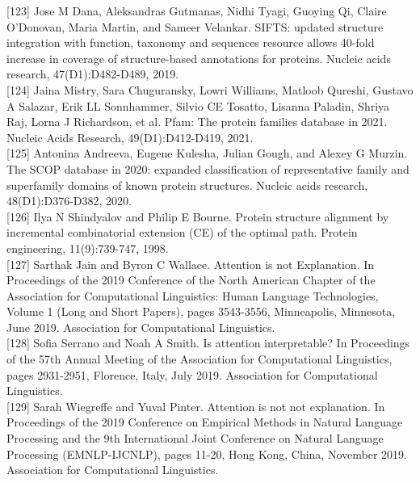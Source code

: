 \documentclass[10pt]{article}
\begin{document}
[123] Jose M Dana, Aleksandras Gutmanas, Nidhi Tyagi, Guoying Qi, Claire O'Donovan, Maria Martin, and Sameer Velankar. SIFTS: updated structure integration with function, taxonomy and sequences resource allows 40-fold increase in coverage of structure-based annotations for proteins. Nucleic acids research, 47(D1):D482-D489, 2019.\\[0pt]
[124] Jaina Mistry, Sara Chuguransky, Lowri Williams, Matloob Qureshi, Gustavo A Salazar, Erik LL Sonnhammer, Silvio CE Tosatto, Lisanna Paladin, Shriya Raj, Lorna J Richardson, et al. Pfam: The protein families database in 2021. Nucleic Acids Research, 49(D1):D412-D419, 2021.\\[0pt]
[125] Antonina Andreeva, Eugene Kulesha, Julian Gough, and Alexey G Murzin. The SCOP database in 2020: expanded classification of representative family and superfamily domains of known protein structures. Nucleic acids research, 48(D1):D376-D382, 2020.\\[0pt]
[126] Ilya N Shindyalov and Philip E Bourne. Protein structure alignment by incremental combinatorial extension (CE) of the optimal path. Protein engineering, 11(9):739-747, 1998.\\[0pt]
[127] Sarthak Jain and Byron C Wallace. Attention is not Explanation. In Proceedings of the 2019 Conference of the North American Chapter of the Association for Computational Linguistics: Human Language Technologies, Volume 1 (Long and Short Papers), pages 3543-3556, Minneapolis, Minnesota, June 2019. Association for Computational Linguistics.\\[0pt]
[128] Sofia Serrano and Noah A Smith. Is attention interpretable? In Proceedings of the 57th Annual Meeting of the Association for Computational Linguistics, pages 2931-2951, Florence, Italy, July 2019. Association for Computational Linguistics.\\[0pt]
[129] Sarah Wiegreffe and Yuval Pinter. Attention is not not explanation. In Proceedings of the 2019 Conference on Empirical Methods in Natural Language Processing and the 9th International Joint Conference on Natural Language Processing (EMNLP-IJCNLP), pages 11-20, Hong Kong, China, November 2019. Association for Computational Linguistics.
\end{document}
